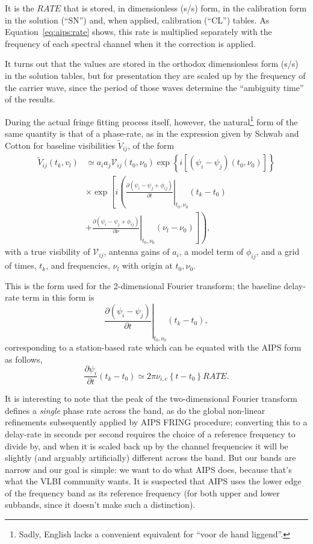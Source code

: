 \documentclass[11pt, twoside, a4paper]{article}
\begin{document}
It is the $\mathit{RATE}$ that is stored, in dimensionless (s/s) form,
in the calibration form in the solution (``SN'') and, when applied,
calibration (``CL'') tables. As Equation~\ref{eq:aips:rate} shows, this
rate is multiplied separately with the frequency of each spectral
channel when it the correction is applied.

It turns out that the values are stored in the orthodox
dimensionless form (s/s) in the solution tables, but for presentation
they are scaled up by the frequency of the carrier wave, since the
period of those waves determine the ``ambiguity time'' of the results.

During the actual fringe fitting process itself, however, the
natural\footnote{Sadly, English lacks a convenient equivalent for ``voor de
  hand liggend''.} 
form of the same quantity is that of a phase-rate, as in the
expression given by Schwab and Cotton\cite{schwab83} for baseline
visibilities $\widetilde{V}_{ij}$, of the form
\begin{equation}\label{eq:phaserate}
  \begin{split}
  \widetilde{V}_{ij}(t_k, v_l) &\simeq a_i a_j \mathcal{V}_{ij}(t_0, \nu_0) 
  \exp
  \left\{i
    \left[(\psi_i-\psi_j)(t_0, \nu_0) \right]
  \right\} \\
  &\times\exp
  \left[i\left(
      \left.
        \frac{\partial (\psi_i-\psi_j + \phi_{ij})}{\partial t}
      \right|_{t_0, \nu_0} (t_k-t_0) \right.\right.
        \\
      &+ \left.\left.\left.
        \frac{\partial (\psi_i-\psi_j + \phi_{ij})}{\partial \nu}
      \right|_{t_0, \nu_0} (\nu_l-\nu_0)
      \right] \right),
  \end{split}
\end{equation}
with a true visibility of $\mathcal{V}_{ij}$,
antenna gains of $a_i$,
a model term of $\phi_{ij}$,
and a grid of times, $t_k$,
and frequencies, $\nu_l$ with origin at $t_0, \nu_0$.

This is the form used for the 2-dimensional Fourier transform; the
baseline delay-rate term in this form is 
\[
\left.\frac{\partial (\psi_i-\psi_j)}{\partial t} \right|_{t_0,
    \nu_0} (t_k-t_0),
\]
corresponding to a station-based rate which can be equated with the
AIPS form as follows,
\begin{equation}
  \frac{\partial \psi_i}{\partial t} (t_k - t_0) \simeq
  2\pi \nu_{i,c} \left\{t-t_0\right\} \mathit{RATE}.
\end{equation}

It is interesting to note that the peak of the two-dimensional Fourier
transform defines a \emph{single} phase rate across the band, as do
the global non-linear refinements subsequently applied by AIPS FRING procedure;
converting this to a delay-rate in seconds per second requires the
choice of a reference frequency to divide by, and when it is scaled
back up by the channel frequencies it will be slightly (and arguably
artificially) different across the band. But our bands are narrow and
our goal is simple: we want to do what AIPS does, because that's what
the VLBI community wants. It is suspected that AIPS uses the lower
edge of the frequency band as its reference frequency (for both upper
and lower subbands, since it doesn't make such a distinction).
\end{document}
